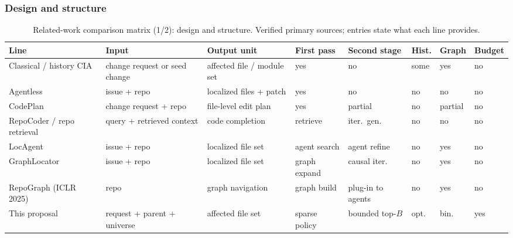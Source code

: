 \documentclass[11pt,a4paper]{article}
\begin{document}
\subsubsection{Design and structure}
\begin{table}[h]
\centering
\footnotesize
\renewcommand{\arraystretch}{1.35}
\setlength{\tabcolsep}{1pt}
\begin{tabularx}{\textwidth}{@{}>{\raggedright\arraybackslash}p{2.2cm}>{\raggedright\arraybackslash}X>{\raggedright\arraybackslash}p{1.55cm}>{\raggedright\arraybackslash}p{1.35cm}>{\raggedright\arraybackslash}p{1.3cm}>{\raggedright\arraybackslash}p{0.85cm}>{\raggedright\arraybackslash}p{1.0cm}>{\raggedright\arraybackslash}p{1.15cm}@{}}
\toprule
Line & Input & Output unit & First pass & Second stage & Hist. & Graph & Budget \\
\midrule
Classical / history CIA & change request or seed change & affected file / module set & yes & no & some & yes & no \\
Agentless & issue + repo & localized files + patch & yes & no & no & no & no \\
CodePlan & change request + repo & file-level edit plan & yes & partial & no & partial & no \\
Repo\-Coder / repo retrieval & query + retrieved context & code completion & retrieve & iter.\ gen. & no & no & no \\
LocAgent & issue + repo & localized file set & agent search & agent refine & no & yes & no \\
Graph\-Locator & issue + repo & localized file set & graph expand & causal iter. & no & yes & no \\
Repo\-Graph (ICLR 2025) & repo & graph navigation & graph build & plug-in to agents & no & yes & no \\
This proposal & request + parent + universe & affected file set & sparse policy & bounded top-$B$ & opt. & bin. & yes \\
\bottomrule
\end{tabularx}
\caption{Related-work comparison matrix (1/2): design and structure. Verified primary sources; entries state what each line provides.}
\end{table}
\end{document}
